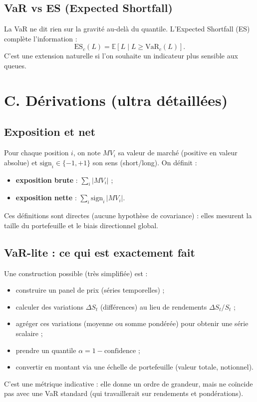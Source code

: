 \documentclass[11pt,a4paper]{report}
\theoremstyle{definition}
\theoremstyle{plain}
\theoremstyle{remark}
\newcommand{\E}{\mathbb{E}}
\newcommand{\1}{\mathbf{1}}
\begin{document}
\subsection*{VaR vs ES (Expected Shortfall)}
La VaR ne dit rien sur la gravité au-delà du quantile.
L'Expected Shortfall (ES) complète l'information :
\[
\mathrm{ES}_c(L)=\E[L\mid L\ge \mathrm{VaR}_c(L)].
\]
C'est une extension naturelle si l'on souhaite un indicateur plus sensible aux queues.

\section{C. Dérivations (ultra détaillées)}
\subsection*{Exposition et net}
Pour chaque position $i$, on note $MV_i$ sa valeur de marché (positive en valeur absolue) et $\text{sign}_i\in\{-1,+1\}$ son sens (short/long). On définit :
\begin{itemize}[leftmargin=*]
\item \textbf{exposition brute} : $\sum_i |MV_i|$ ;
\item \textbf{exposition nette} : $\sum_i \text{sign}_i\,|MV_i|$.
\end{itemize}
Ces définitions sont directes (aucune hypothèse de covariance) : elles mesurent la taille du portefeuille et le biais directionnel global.

\subsection*{VaR-lite : ce qui est exactement fait}
Une construction possible (très simplifiée) est :
\begin{itemize}[leftmargin=*]
\item construire un panel de prix (séries temporelles) ;
\item calculer des variations $\Delta S_t$ (différences) au lieu de rendements $\Delta S_t/S_t$ ;
\item agréger ces variations (moyenne ou somme pondérée) pour obtenir une série scalaire ;
\item prendre un quantile $\alpha=1-\text{confidence}$ ;
\item convertir en montant via une échelle de portefeuille (valeur totale, notionnel).
\end{itemize}
C'est une métrique indicative : elle donne un ordre de grandeur, mais ne coïncide pas avec une VaR standard (qui travaillerait sur rendements et pondérations).
\end{document}
